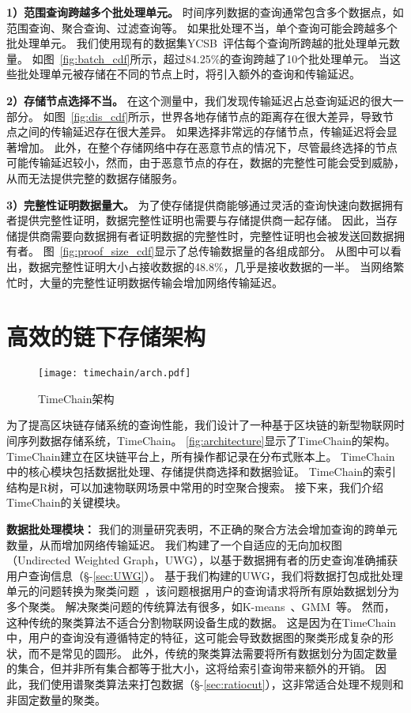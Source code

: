 \textbf{1）范围查询跨越多个批处理单元。}
时间序列数据的查询通常包含多个数据点，如范围查询、聚合查询、过滤查询等。
如果批处理不当，单个查询可能会跨越多个批处理单元。
我们使用现有的数据集YCSB~\cite{barata2014ycsb}评估每个查询所跨越的批处理单元数量。
如图~\autoref{fig:batch_cdf}所示，超过84.25\%的查询跨越了10个批处理单元。
当这些批处理单元被存储在不同的节点上时，将引入额外的查询和传输延迟。

\textbf{2）存储节点选择不当。}
在这个测量中，我们发现传输延迟占总查询延迟的很大一部分。
如图~\autoref{fig:dis_cdf}所示，世界各地存储节点的距离存在很大差异，导致节点之间的传输延迟存在很大差异。
如果选择非常远的存储节点，传输延迟将会显著增加。
此外，在整个存储网络中存在恶意节点的情况下，尽管最终选择的节点可能传输延迟较小，然而，由于恶意节点的存在，数据的完整性可能会受到威胁，从而无法提供完整的数据存储服务。

\textbf{3）完整性证明数据量大。}
为了使存储提供商能够通过灵活的查询快速向数据拥有者提供完整性证明，数据完整性证明也需要与存储提供商一起存储。
因此，当存储提供商需要向数据拥有者证明数据的完整性时，完整性证明也会被发送回数据拥有者。
图~\autoref{fig:proof_size_cdf}显示了总传输数据量的各组成部分。
从图中可以看出，数据完整性证明大小占接收数据的48.8\%，几乎是接收数据的一半。
当网络繁忙时，大量的完整性证明数据传输会增加网络传输延迟。

\section{高效的链下存储架构}
\label{sec:design}

\begin{figure}[t]
    \centering
    \texttt{[image: timechain/arch.pdf]}
    \caption{TimeChain架构}
    \label{fig:architecture}
\end{figure}

为了提高区块链存储系统的查询性能，我们设计了一种基于区块链的新型物联网时间序列数据存储系统，TimeChain。
\autoref{fig:architecture}显示了TimeChain的架构。
TimeChain建立在区块链平台上，所有操作都记录在分布式账本上。
TimeChain中的核心模块包括数据批处理、存储提供商选择和数据验证。
TimeChain的索引结构是R树，可以加速物联网场景中常用的时空聚合搜索。
接下来，我们介绍TimeChain的关键模块。

\textbf{数据批处理模块：}
我们的测量研究表明，不正确的聚合方法会增加查询的跨单元数量，从而增加网络传输延迟。
我们构建了一个自适应的无向加权图（Undirected Weighted Graph，UWG），以基于数据拥有者的历史查询准确捕获用户查询信息（§-\ref{sec:UWG}）。
基于我们构建的UWG，我们将数据打包成批处理单元的问题转换为聚类问题~\cite{xu2005survey}，该问题根据用户的查询请求将所有原始数据划分为多个聚类。
解决聚类问题的传统算法有很多，如K-means~\cite{kanungo2002efficient}、GMM~\cite{he2010laplacian}等。
然而，这种传统的聚类算法不适合分割物联网设备生成的数据。
这是因为在TimeChain中，用户的查询没有遵循特定的特征，这可能会导致数据图的聚类形成复杂的形状，而不是常见的圆形。
此外，传统的聚类算法需要将所有数据划分为固定数量的集合，但并非所有集合都等于批大小，这将给索引查询带来额外的开销。
因此，我们使用谱聚类算法来打包数据（§-\ref{sec:ratiocut}），这非常适合处理不规则和非固定数量的聚类。

